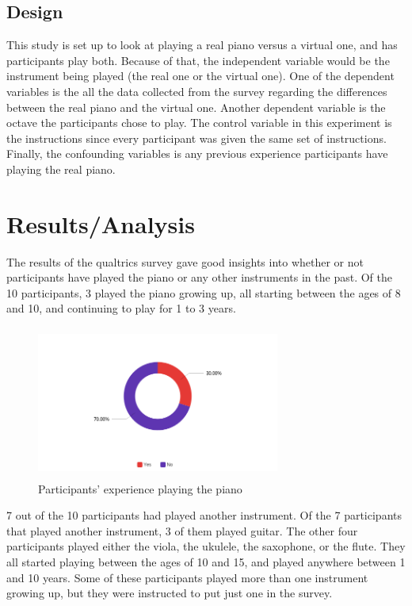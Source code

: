 \documentclass[sigconf,authordraft]{acmart}
\begin{document}
\subsection{Design}
This study is set up to look at playing a real piano versus a virtual one, and has participants play both.  Because of that, the independent variable would be the instrument being played (the real one or the virtual one).  One of the dependent variables is the all the data collected from the survey regarding the differences between the real piano and the virtual one.  Another dependent variable is the octave the participants chose to play.  The control variable in this experiment is the instructions since every participant was given the same set of instructions.  Finally, the confounding variables is any previous experience participants have playing the real piano.

\section{Results/Analysis}
The results of the qualtrics survey gave good insights into whether or not participants have played the piano or any other instruments in the past.  Of the 10 participants, 3 played the piano growing up, all starting between the ages of 8 and 10, and continuing to play for 1 to 3 years.

\begin{figure}[h]
\centering
\includegraphics[width=8cm, height=5cm]{PianoExperience.png}
\centering
\caption{Participants' experience playing the piano}
\end{figure}

7 out of the 10 participants had played another instrument.  Of the 7 participants that played another instrument, 3 of them played guitar.  The other four participants played either the viola, the ukulele, the saxophone, or the flute.  They all started playing between the ages of 10 and 15, and played anywhere between 1 and 10 years.  Some of these participants played more than one instrument growing up, but they were instructed to put just one in the survey.
\end{document}
